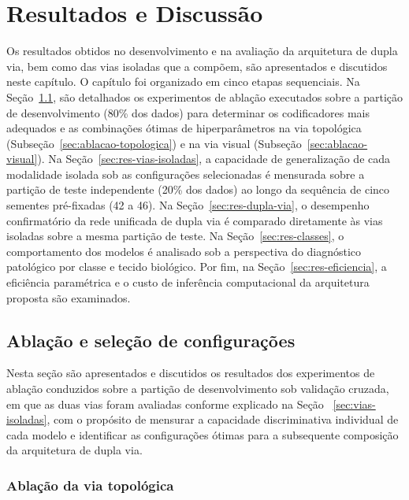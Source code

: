 \chapter{Resultados e Discussão}
\label{chap:resultados}

Os resultados obtidos no desenvolvimento e na avaliação da arquitetura de dupla via, bem como das vias isoladas que a compõem, são apresentados e discutidos neste capítulo. O capítulo foi organizado em cinco etapas sequenciais. Na Seção~\ref{sec:ablacao}, são detalhados os experimentos de ablação executados sobre a partição de desenvolvimento (80\% dos dados) para determinar os codificadores mais adequados e as combinações ótimas de hiperparâmetros na via topológica (Subseção~\ref{sec:ablacao-topologica}) e na via visual (Subseção~\ref{sec:ablacao-visual}). Na Seção~\ref{sec:res-vias-isoladas}, a capacidade de generalização de cada modalidade isolada sob as configurações selecionadas é mensurada sobre a partição de teste independente (20\% dos dados) ao longo da sequência de cinco sementes pré-fixadas (42 a 46). Na Seção~\ref{sec:res-dupla-via}, o desempenho confirmatório da rede unificada de dupla via é comparado diretamente às vias isoladas sobre a mesma partição de teste. Na Seção~\ref{sec:res-classes}, o comportamento dos modelos é analisado sob a perspectiva do diagnóstico patológico por classe e tecido biológico. Por fim, na Seção~\ref{sec:res-eficiencia}, a eficiência paramétrica e o custo de inferência computacional da arquitetura proposta são examinados.

\section{Ablação e seleção de configurações}
\label{sec:ablacao}
\label{chap:res-ablacao}

Nesta seção são apresentados e discutidos os resultados dos experimentos de ablação conduzidos sobre a partição de desenvolvimento sob validação cruzada, em que as duas vias foram avaliadas conforme explicado na Seção ~\ref{sec:vias-isoladas}, com o propósito de mensurar a capacidade discriminativa individual de cada modelo e identificar as configurações ótimas para a subsequente composição da arquitetura de dupla via.

\subsection{Ablação da via topológica}
\label{sec:via-topologica}
\label{sec:ablacao-topologica}

